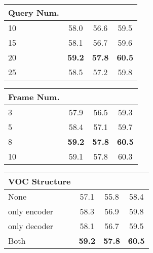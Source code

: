 \documentclass{article}
\begin{document}
\begin{table*}[t]
\begin{minipage}[c]{\textwidth}
\begin{minipage}[c]{0.31\textwidth}
\begin{tabular}{l c c c}
        \toprule
         Query Num. &  & &  \\
        \midrule
        10   & 58.0 & 56.6  & 59.5 \\ 
        15   &  58.1 & 56.7 & 59.6 \\
        20   &  \textbf{59.2} & \textbf{57.8} & \textbf{60.5} \\
        25   &  58.5 & 57.2 & 59.8 \\
        \bottomrule
        \end{tabular}
        \caption{Results of different object query numbers.}
        \label{tab:fusion_qn}
    \end{minipage}
    \hspace{0.01\textwidth}
    \begin{minipage}[c]{0.31\textwidth}
        \makeatletter{}
        \centering
        \footnotesize
        \renewcommand\arraystretch{0.8}
        \setlength{\tabcolsep}{2.5pt}
        \begin{tabular}{l c c c}
        \toprule
        Frame Num.  &  & &  \\
        \midrule
          3   &  57.9 & 56.5 & 59.3\\
          5   &  58.4 & 57.1 & 59.7 \\
          8   &  \textbf{59.2} & \textbf{57.8} & \textbf{60.5} \\
          10   &  59.1 & 57.8 & 60.3 \\
        \bottomrule
        \end{tabular}
        \caption{Results of different training frame numbers.}
        \label{tab:frame_num}
    \end{minipage}
    \hspace{0.01\textwidth}
    \begin{minipage}[c]{0.31\textwidth}
        \makeatletter{}
        \centering
        \footnotesize
        \renewcommand\arraystretch{0.8}
        \setlength{\tabcolsep}{2.5pt}
        \begin{tabular}{l c c c}
        \toprule
        VOC Structure  &  & &  \\
        \midrule
          None   &  57.1 & 55.8 & 58.4\\
          only encoder   &  58.3 & 56.9 & 59.8 \\
          only decoder   &  58.1 & 56.7 & 59.5 \\
          Both   &  \textbf{59.2} & \textbf{57.8} & \textbf{60.5} \\
        \bottomrule
        \end{tabular}
        \caption{The structure design of the VOC module.}
        \label{tab:voc_structure}
    \end{minipage}
\end{minipage}
\vspace{-10pt}
\end{table*}
\end{document}
